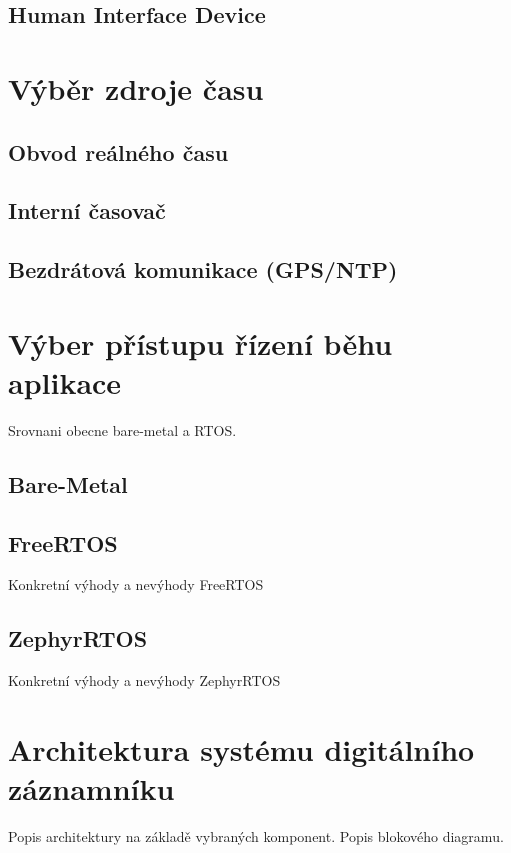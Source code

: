 \subsection{Human Interface Device}

\section{Výběr zdroje času}

\subsection{Obvod reálného času}

\subsection{Interní časovač}

\subsection{Bezdrátová komunikace (GPS/NTP)}

\section{Výber přístupu řízení běhu aplikace}
Srovnani obecne bare-metal a RTOS.


\subsection{Bare-Metal}

\subsection{FreeRTOS}
Konkretní výhody a nevýhody FreeRTOS

\subsection{ZephyrRTOS}
Konkretní výhody a nevýhody ZephyrRTOS


\section{Architektura systému digitálního záznamníku}
Popis architektury na základě vybraných komponent. Popis blokového diagramu.

